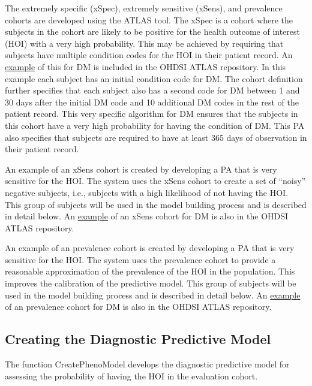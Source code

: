 \documentclass[]{article}
\begin{document}
The extremely specific (xSpec), extremely sensitive (xSens), and
prevalence cohorts are developed using the ATLAS tool. The xSpec is a
cohort where the subjects in the cohort are likely to be positive for
the health outcome of interest (HOI) with a very high probability. This
may be achieved by requiring that subjects have multiple condition codes
for the HOI in their patient record. An
\href{http://www.ohdsi.org/web/atlas/\#/cohortdefinition/1769699}{example}
of this for DM is included in the OHDSI ATLAS repository. In this
example each subject has an initial condition code for DM. The cohort
definition further specifies that each subject also has a second code
for DM between 1 and 30 days after the initial DM code and 10 additional
DM codes in the rest of the patient record. This very specific algorithm
for DM ensures that the subjects in this cohort have a very high
probability for having the condition of DM. This PA also specifies that
subjects are required to have at least 365 days of observation in their
patient record.

An example of an xSens cohort is created by developing a PA that is very
sensitive for the HOI. The system uses the xSens cohort to create a set
of ``noisy'' negative subjects, i.e., subjects with a high likelihood of
not having the HOI. This group of subjects will be used in the model
building process and is described in detail below. An
\href{http://www.ohdsi.org/web/atlas/\#/cohortdefinition/1770120}{example}
of an xSens cohort for DM is also in the OHDSI ATLAS repository.

An example of an prevalence cohort is created by developing a PA that is
very sensitive for the HOI. The system uses the prevalence cohort to
provide a reasonable approximation of the prevalence of the HOI in the
population. This improves the calibration of the predictive model. This
group of subjects will be used in the model building process and is
described in detail below. An
\href{http://www.ohdsi.org/web/atlas/\#/cohortdefinition/1770119}{example}
of an prevalence cohort for DM is also in the OHDSI ATLAS repository.

\hypertarget{creating-the-diagnostic-predictive-model}{%
\subsection{Creating the Diagnostic Predictive
Model}\label{creating-the-diagnostic-predictive-model}}

The function CreatePhenoModel develops the diagnostic predictive model
for assessing the probability of having the HOI in the evaluation
cohort.
\end{document}
